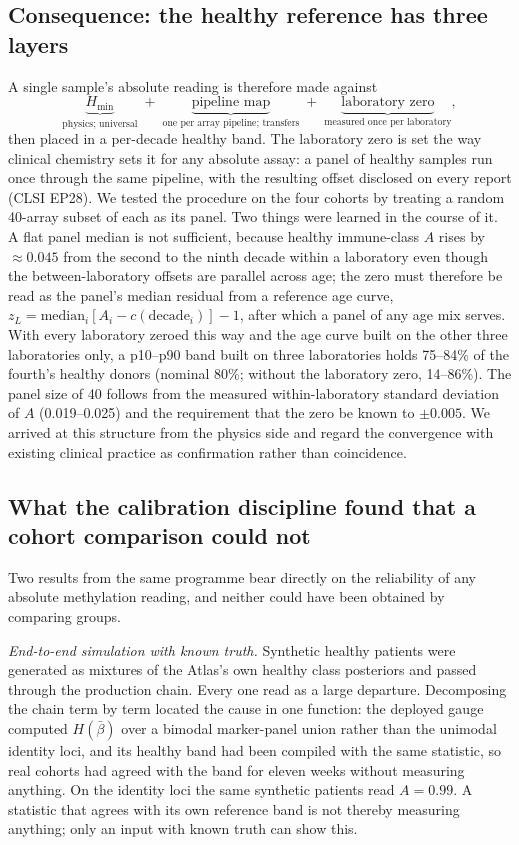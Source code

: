 \documentclass[12pt,a4paper]{article}
\begin{document}
\subsection{Consequence: the healthy reference has three layers}
A single sample's absolute reading is therefore made against
\[
\underbrace{H_{\min}}_{\text{physics; universal}}\;+\;\underbrace{\text{pipeline map}}_{\text{one per array pipeline; transfers}}\;+\;\underbrace{\text{laboratory zero}}_{\text{measured once per laboratory}},
\]
then placed in a per-decade healthy band. The laboratory zero is set the way clinical chemistry sets it for any absolute assay: a panel of healthy samples run once through the same pipeline, with the resulting offset disclosed on every report (CLSI EP28). We tested the procedure on the four cohorts by treating a random 40-array subset of each as its panel. Two things were learned in the course of it. A flat panel median is not sufficient, because healthy immune-class $A$ rises by $\approx 0.045$ from the second to the ninth decade within a laboratory even though the between-laboratory offsets are parallel across age; the zero must therefore be read as the panel's median residual from a reference age curve, $z_L = \mathrm{median}_i[A_i - c(\mathrm{decade}_i)] - 1$, after which a panel of any age mix serves. With every laboratory zeroed this way and the age curve built on the other three laboratories only, a p10--p90 band built on three laboratories holds 75--84\% of the fourth's healthy donors (nominal 80\%; without the laboratory zero, 14--86\%). The panel size of 40 follows from the measured within-laboratory standard deviation of $A$ (0.019--0.025) and the requirement that the zero be known to $\pm 0.005$. We arrived at this structure from the physics side and regard the convergence with existing clinical practice as confirmation rather than coincidence.

\subsection{What the calibration discipline found that a cohort comparison could not}
\label{sec:sim}
Two results from the same programme bear directly on the reliability of any absolute methylation reading, and neither could have been obtained by comparing groups.

\emph{End-to-end simulation with known truth.} Synthetic healthy patients were generated as mixtures of the Atlas's own healthy class posteriors and passed through the production chain. Every one read as a large departure. Decomposing the chain term by term located the cause in one function: the deployed gauge computed $H(\bar\beta)$ over a bimodal marker-panel union rather than the unimodal identity loci, and its healthy band had been compiled with the same statistic, so real cohorts had agreed with the band for eleven weeks without measuring anything. On the identity loci the same synthetic patients read $A = 0.99$. A statistic that agrees with its own reference band is not thereby measuring anything; only an input with known truth can show this.
\end{document}
